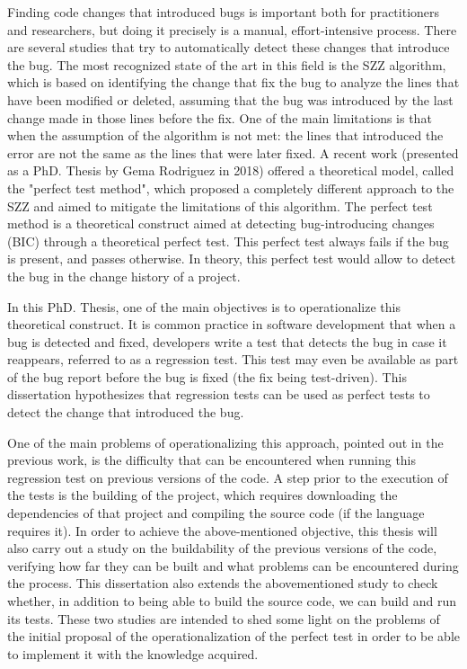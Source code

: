 Finding code changes that introduced bugs is important both for practitioners and researchers, but doing it precisely is a manual, effort-intensive process.
There are several studies that try to automatically detect these changes that introduce the bug. 
The most recognized state of the art in this field is the SZZ algorithm, which is based on identifying the change that fix the bug to analyze the lines that have been modified or deleted, assuming that the bug was introduced by the last change made in those lines before the fix. 
One of the main limitations is that when the assumption of the algorithm is not met: the lines that introduced the error are not the same as the lines that were later fixed.
A recent work (presented as a PhD. Thesis by Gema Rodriguez in 2018) offered a theoretical model, called the "perfect test method", which proposed a completely different approach to the SZZ and aimed to mitigate the limitations of this algorithm. 
The perfect test method is a theoretical construct aimed at detecting bug-introducing changes (BIC) through a theoretical perfect test. This perfect test always fails if the bug is present, and passes otherwise.
In theory, this perfect test would allow to detect the bug in the change history of a project.

In this PhD. Thesis, one of the main objectives is to operationalize this theoretical construct.
It is common practice in software development that when a bug is detected and fixed, developers write a test that detects the bug in case it reappears, referred to as a regression test. 
This test may even be available as part of the bug report before the bug is fixed (the fix being test-driven). 
This dissertation hypothesizes that regression tests can be used as perfect tests to detect the change that introduced the bug. 

One of the main problems of operationalizing this approach, pointed out in the previous work, is the difficulty that can be encountered when running this regression test on previous versions of the code. 
A step prior to the execution of the tests is the building of the project, which requires downloading the dependencies of that project and compiling the source code (if the language requires it). 
In order to achieve the above-mentioned objective, this thesis will also carry out a study on the buildability of the previous versions of the code, verifying how far they can be built and what problems can be encountered during the process.
This dissertation also extends the abovementioned study to check whether, in addition to being able to build the source code, we can build and run its tests. 
These two studies are intended to shed some light on the problems of the initial proposal of the operationalization of the perfect test in order to be able to implement it with the knowledge acquired.

